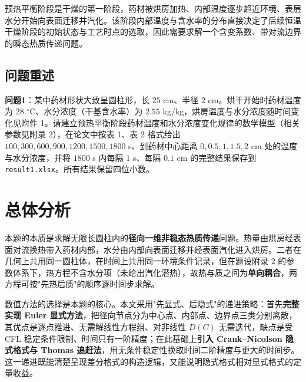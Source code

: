 \documentclass[12pt,a4paper]{ctexart}
\begin{document}
预热平衡阶段是干燥的第一阶段，药材被烘房加热、内部温度逐步趋近环境、表层水分开始向表面迁移并汽化。该阶段内部温度与含水率的分布直接决定了后续恒温干燥阶段的初始状态与工艺时点的选取，因此需要求解一个含变系数、带对流边界的瞬态热质传递问题。

\subsection{问题重述}
\textbf{问题1}：某中药材形状大致呈圆柱形，长 $25$ cm、半径 $2$ cm。烘干开始时药材温度为 $28$ $^\circ$C、水分浓度（干基含水率）为 $2.55$ kg/kg，烘房温度与水分浓度随时间变化见附件 1。请建立预热平衡阶段药材温度和水分浓度变化规律的数学模型（相关参数见附录 2），在论文中按表 1、表 2 格式给出 $100,300,600,900,1200,1500,1800$ s、到药材中心距离 $0,0.5,1,1.5,2$ cm 处的温度与水分浓度，并将 $1800$ s 内每隔 $1$ s、每隔 $0.1$ cm 的完整结果保存到 \texttt{result1.xlsx}。所有结果保留四位小数。

\section{总体分析}
本题的本质是求解无限长圆柱内的\textbf{径向一维非稳态热质传递}问题。热量由烘房经表面对流换热带入药材内部，水分由内部向表面迁移并经表面汽化进入烘房。二者在几何上共用同一圆柱体，在时间上共用同一环境条件记录，但在题设附录 2 的参数体系下，热方程不含水分项（未给出汽化潜热），故热与质之间为\textbf{单向耦合}，两方程可按"先热后质"的顺序逐时间步求解。

数值方法的选择是本题的核心。本文采用"先显式、后隐式"的递进策略：首先\textbf{完整实现 Euler 显式方法}，把径向节点分为中心点、内部点、边界点三类分别离散，其优点是逐点推进、无需解线性方程组、对非线性 $D(C)$ 无需迭代，缺点是受 CFL 稳定条件限制、时间只有一阶精度；在此基础上\textbf{引入 Crank--Nicolson 隐式格式与 Thomas 追赶法}，用无条件稳定性换取时间二阶精度与更大的时间步。这一递进既能清楚呈现差分格式的构造逻辑，又能说明隐式格式相对显式格式的定量收益。

\end{document}
